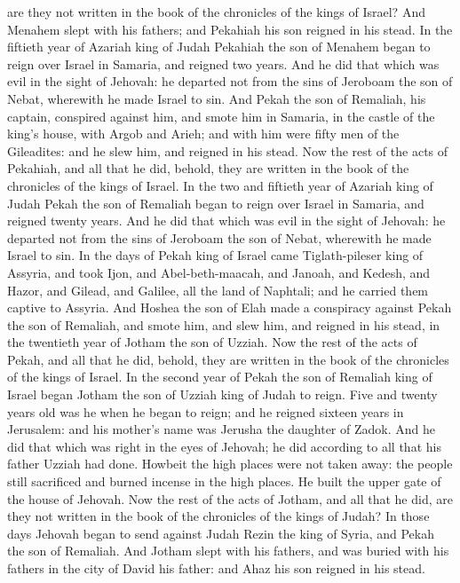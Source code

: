 are they not written in the book of the chronicles of the kings of Israel? And Menahem slept with his fathers; and Pekahiah his son reigned in his stead.  In the fiftieth year of Azariah king of Judah Pekahiah the son of Menahem began to reign over Israel in Samaria, and reigned two years. And he did that which was evil in the sight of Jehovah: he departed not from the sins of Jeroboam the son of Nebat, wherewith he made Israel to sin. And Pekah the son of Remaliah, his captain, conspired against him, and smote him in Samaria, in the castle of the king’s house, with Argob and Arieh; and with him were fifty men of the Gileadites: and he slew him, and reigned in his stead. Now the rest of the acts of Pekahiah, and all that he did, behold, they are written in the book of the chronicles of the kings of Israel.  In the two and fiftieth year of Azariah king of Judah Pekah the son of Remaliah began to reign over Israel in Samaria, and reigned twenty years. And he did that which was evil in the sight of Jehovah: he departed not from the sins of Jeroboam the son of Nebat, wherewith he made Israel to sin.  In the days of Pekah king of Israel came Tiglath-pileser king of Assyria, and took Ijon, and Abel-beth-maacah, and Janoah, and Kedesh, and Hazor, and Gilead, and Galilee, all the land of Naphtali; and he carried them captive to Assyria. And Hoshea the son of Elah made a conspiracy against Pekah the son of Remaliah, and smote him, and slew him, and reigned in his stead, in the twentieth year of Jotham the son of Uzziah. Now the rest of the acts of Pekah, and all that he did, behold, they are written in the book of the chronicles of the kings of Israel.  In the second year of Pekah the son of Remaliah king of Israel began Jotham the son of Uzziah king of Judah to reign. Five and twenty years old was he when he began to reign; and he reigned sixteen years in Jerusalem: and his mother’s name was Jerusha the daughter of Zadok. And he did that which was right in the eyes of Jehovah; he did according to all that his father Uzziah had done. Howbeit the high places were not taken away: the people still sacrificed and burned incense in the high places. He built the upper gate of the house of Jehovah. Now the rest of the acts of Jotham, and all that he did, are they not written in the book of the chronicles of the kings of Judah? In those days Jehovah began to send against Judah Rezin the king of Syria, and Pekah the son of Remaliah. And Jotham slept with his fathers, and was buried with his fathers in the city of David his father: and Ahaz his son reigned in his stead. 

